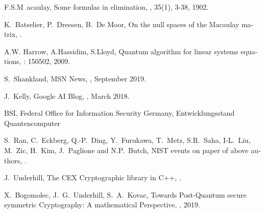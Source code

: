 \documentclass[a4paper,11pt]{article}
\begin{document}
\begin{otherlanguage}{english}
\begin{thebibliography}{1}
F.S.M~acaulay, 
  \newblock Some formulas in elimination, 
  , 35(1), 3-38, 1902. 

K.~Batselier, P.~Dreesen, B.~De Moor, 
  \newblock On the null spaces of the Macaulay matrix, 
  .  

A.W. Harrow, A.Hassidim, S.Lloyd, 
  \newblock Quantum algorithm for linear systems equations, 
  : 150502, 2009. 

  S.~Shankland,
  \newblock MSN News,
  , September 2019.

  J.~Kelly,
  \newblock Google AI Blog,
  , March 2018.

BSI, Federal Office for Information Security Germany,
  \newblock Entwicklungsstand Quantencomputer

  S.~Ran, C.~Eckberg, Q.-P.~Ding, Y.~Furukawa, T.~Metz, S.R.~Saha, I-L.~Liu, M.~Zic, H.~Kim, J.~Paglione and N.P.~Butch,
  \newblock NIST events on paper of above authors,
  .

J.~Underhill,
  \newblock The CEX Cryptographic library in C++,
  .

X.~Bogomolec, J.~G.~Underhill, S.~A.~Kovac,
  \newblock Towards Post-Quantum secure symmetric Cryptography: 
A mathematical Perspective,  
  , 2019.


  
\end{thebibliography}



\end{otherlanguage}
\end{document}
